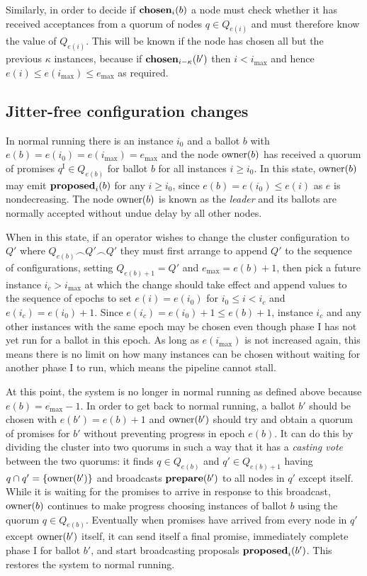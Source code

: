 \documentclass[journal]{IEEEtran}
\begin{document}
Similarly, in order to decide if $\mathbf{chosen}_{i}(b)$ a node must check whether it
has received acceptances from a quorum of nodes $q \in Q_{e(i)}$ and must
therefore know the value of $Q_{e(i)}$. This will be known if the node has
chosen all but the previous $\kappa$ instances, because if
$\mathbf{chosen}_{i-\kappa}(b')$ then $i < i_\mathrm{max}$ and hence ${e(i) \le
e(i_\mathrm{max}) \le e_\mathrm{max}}$ as required.

\subsection{Jitter-free configuration changes}

In normal running there is an instance $i_0$ and a ballot $b$ with ${e(b) =
e(i_0) = e(i_\mathrm{max}) = e_\mathrm{max}}$ and the node $\mathrm{owner}(b)$ has
received a quorum of promises $q^\textrm{I} \in Q_{e(b)}$ for ballot $b$ for
all instances $i \ge i_0$. In this state, $\mathrm{owner}(b)$ may emit $\mathbf{proposed}_{i}(b)$
for any $i \ge i_0$, since $e(b) = e(i_0) \le e(i)$ as $e$ is nondecreasing.
The node $\mathrm{owner}(b)$ is known as the \textit{leader} and its ballots are
normally accepted without undue delay by all other nodes.

When in this state, if an operator wishes to change the cluster configuration
to $Q'$ where $Q_{e(b)} \frown Q' \frown Q'$ they must first arrange to append
$Q'$ to the sequence of configurations, setting $Q_{e(b)+1} = Q'$ and
$e_\mathrm{max} = e(b) + 1$, then pick a future instance $i_c > i_\mathrm{max}$
at which the change should take effect and append values to the sequence of
epochs to set $e(i) = e(i_0)$ for $i_0 \le i < i_c$ and $e(i_c) = e(i_0) + 1$.
Since $e(i_c) = e(i_0) + 1 \le e(b) + 1$, instance $i_c$ and any other
instances with the same epoch may be chosen even though phase I has not yet run
for a ballot in this epoch. As long as $e(i_\mathrm{max})$ is not increased
again, this means there is no limit on how many instances can be chosen without
waiting for another phase I to run, which means the pipeline cannot stall.

At this point, the system is no longer in normal running as defined above
because $e(b) = e_\mathrm{max} - 1$. In order to get back to normal running, a
ballot $b'$ should be chosen with $e(b') = e(b) + 1$ and $\mathrm{owner}(b')$ should
try and obtain a quorum of promises for $b'$ without preventing progress in
epoch $e(b)$. It can do this by dividing the cluster into two quorums in such a
way that it has a \textit{casting vote} between the two quorums: it finds $q
\in Q_{e(b)}$ and $q' \in Q_{e(b)+1}$ having $q \cap q' = \{\mathrm{owner}(b')\}$ and
broadcasts $\mathbf{prepare}(b')$ to all nodes in $q'$ except itself. While it is waiting
for the promises to arrive in response to this broadcast, $\mathrm{owner}(b)$ continues
to make progress choosing instances of ballot $b$ using the quorum $q \in
Q_{e(b)}$.  Eventually when promises have arrived from every node in $q'$
except $\mathrm{owner}(b')$ itself, it can send itself a final promise, immediately
complete phase I for ballot $b'$, and start broadcasting proposals
$\mathbf{proposed}_{i}(b')$.  This restores the system to normal running.
\end{document}
